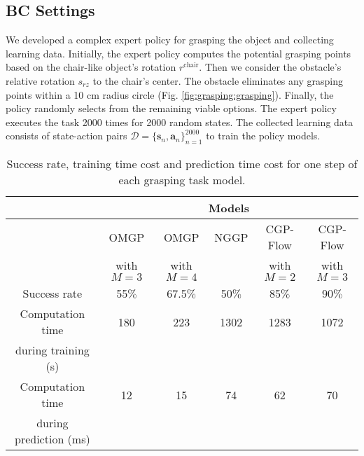 \documentclass[sn-mathphys-num]{sn-jnl}
\begin{document}
\subsection{BC Settings}
We developed a complex expert policy for grasping the object and collecting learning data.
Initially, the expert policy computes the potential grasping points based on the chair-like object's rotation $r^\mathrm{chair}$.
Then we consider the obstacle's relative rotation $s_{rz}$ to the chair's center.
The obstacle eliminates any grasping points within a 10 cm radius circle (Fig. \ref{fig:grasping:grasping}). Finally, the policy randomly selects from the remaining viable options.
The expert policy executes the task 2000 times for 2000 random states. The collected learning data consists of state-action pairs ${\mathcal D}=\{{\mathbf{s}}_n, {\mathbf{a}}_n\}_{n=1}^{2000}$ to train the policy models. 

\begin{table}[t]
    \centering
    \renewcommand{\arraystretch}{1.1}
    \caption{Success rate, training time cost and prediction time cost for one step of each grasping task model.}
    \label{tab:grasping:sucess_rate}
    \begin{tabular}{|c||c|c|c|c|c|} \hline
                                            & \multicolumn{5}{c|}{Models} \\ \hline
                                            & OMGP      & OMGP      & NGGP  & CGP-Flow  & CGP-Flow  \\
                                            & with $M=3$ & with $M=4$ &        & with $M=2$ & with $M=3$ \\ \hline\hline
        Success rate                        & 55$\%$     & 67.5$\%$   & 50$\%$ & 85$\%$     & 90$\%$     \\ \hline
        Computation time      & 180        & 223        & 1302   & 1283       & 1072       \\ 
        during training (s)  & & & & & \\ \hline
       Computation time     & 12         & 15         & 74     & 62         & 70         \\ 
       during prediction (ms) & & & & & \\ \hline
    \end{tabular}
\end{table}
\end{document}
